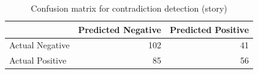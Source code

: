 \begin{table}
\caption{Confusion matrix for contradiction detection (story)}
\label{tab:confusion_matrix}
\begin{tabular}{lrr}
\toprule
 & Predicted Negative & Predicted Positive \\
\midrule
Actual Negative & 102 & 41 \\
Actual Positive & 85 & 56 \\
\bottomrule
\end{tabular}
\end{table}
